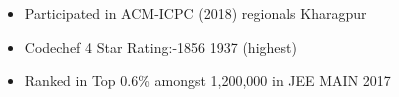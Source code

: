 \documentclass[10pt,a4paper,ragged2e]{altacv}
\begin{document}
\begin{itemize}
\item\linespread{1.2} \large Participated in ACM-ICPC (2018) regionals  Kharagpur



\item  Codechef 4 Star Rating:-1856    1937 (highest)
\item  Ranked in Top 0.6\% amongst 1,200,000 in JEE MAIN 2017

\end{itemize}





%




\clearpage

% 
% 
% 
% 
% 
% 
% 
\end{document}
